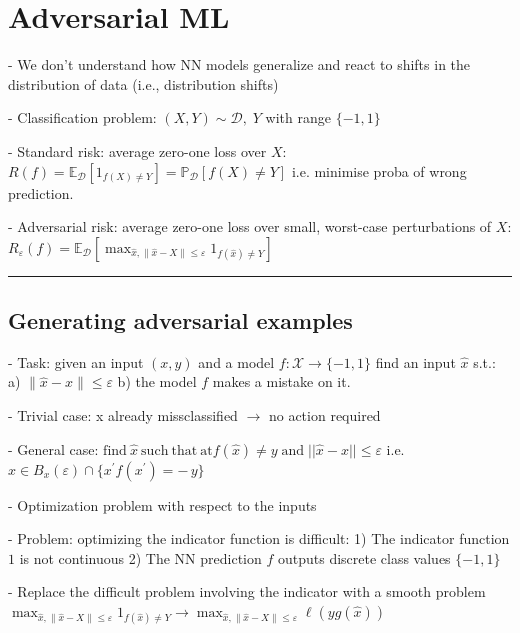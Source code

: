 \section{Adversarial ML}

- We don't understand how NN models generalize and react to shifts in the distribution of data (i.e., distribution shifts)

- Classification problem: $(X,Y)\sim{\mathcal{D}},\;Y$ with range $\{-1,1\}$

- Standard risk: average zero-one loss over $X$: $R(f)=\mathbb{E}_{\mathcal{D}}\left[1_{f(X)\neq Y}\right]=\mathbb{P}_{\mathcal{D}}\left[f(X)\neq Y\right]$ i.e. minimise proba of wrong prediction.


- Adversarial risk: average zero-one loss over small, worst-case perturbations of $X$: $R_{\varepsilon}(f)={{{\mathbb{E}}}}_{\mathcal{D}}\left[\operatorname*{max}_{\hat{x},\|\hat{x}-X\|\leq\varepsilon}1_{f(\hat{x})\neq Y}\right]$

\vspace{4pt}
\hrule
\vspace{4pt}
\subsection{Generating adversarial examples}

- Task: given an input $(x, y)$ and a model $f : \mathcal{X}\rightarrow \{-1,1\}$ find an input $\hat{x}$ s.t.: 
a) $\|{\hat{x}}-x\|\leq\varepsilon$ b) the model $f$ makes a mistake on it.

- Trivial case: x already missclassified $\rightarrow$ no action required

- General case: ${\mathrm{find~}}{\hat{x}}~\mathrm{such~that}{\mathrm{~at}}f({\hat{x}})\neq y\operatorname{and}{\big\vert\vert}{\hat{x}}-x\vert\vert\leq\varepsilon$ i.e. $\hat{x}\in B_{x}(\varepsilon)\cap\{x^{\prime}f(x^{\prime})=-\,y\}$

- Optimization problem with respect to the inputs

- Problem: optimizing the indicator function is difficult: 1) The indicator function $1$ is not continuous 2) The NN prediction $f$ outputs discrete class values $\{-1,1\}$

- Replace the difficult problem involving the indicator with a smooth problem $\operatorname*{max}_{\hat{x},\|\hat{x}-X\|\leq\varepsilon}1_{f(\hat{x})\neq Y} \rightarrow \operatorname*{max}_{\hat{x},\|\hat{x}-X\|\leq\varepsilon}\ell(yg(\hat{x}))$

